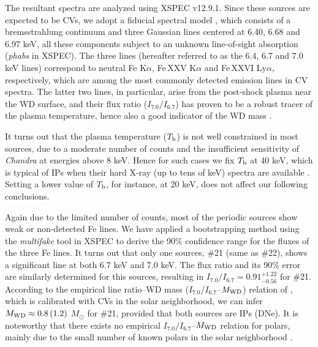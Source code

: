 \documentclass[fleqn,usenatbib]{mnras}
\begin{document}
The resultant spectra are analyzed using XSPEC v12.9.1.
Since these sources are expected to be CVs, we adopt a fiducial spectral model \citep{2018ApJS..235...26Z,2019ApJ...882..164X}, which consists of a bremsstrahlung continuum and three Gaussian lines centered at 6.40, 6.68 and 6.97 keV, all these components subject to an unknown line-of-sight absorption (\emph{phabs} in XSPEC). 
The three lines (hereafter referred to as the 6.4, 6.7 and 7.0 keV lines) correspond to neutral Fe K$\alpha$, Fe\,XXV K$\alpha$ and Fe\,XXVI Ly$\alpha$, respectively, which are among the most commonly detected emission lines in CV spectra. The latter two lines, in particular, arise from the post-shock plasma near the WD surface, and their flux ratio ($I_{7.0}/I_{6.7}$) has proven to be a robust tracer of the plasma temperature, hence also a good indicator of the WD mass \citep{2016ApJ...818..136X}.

It turns out that the plasma temperature ($T_{\rm b}$) is not well constrained in most sources, due to a moderate number of counts and the insufficient sensitivity of {\it Chandra} at energies above 8 keV. Hence for such cases we fix $T_{\rm b}$ at 40 keV, which is typical of IPs when their hard X-ray (up to tens of keV) spectra are available \citep{2016ApJ...818..136X,2016ApJ...826..160H}.
Setting a lower value of $T_{\rm b}$, for instance, at 20 keV, does not affect our following conclusions. 

Again due to the limited number of counts, most of the periodic sources show weak or non-detected Fe lines.  
We have applied a bootstrapping method using the {\it multifake} tool in XSPEC to derive the 90\% confidence range for the fluxes of the three Fe lines. It turns out that only one sources, \#21 (same as \#22), shows a significant line at both 6.7 keV and 7.0 keV.  
The flux ratio and its 90\% error are similarly determined for this sources, resulting in $I_{7.0}/I_{6.7} = 0.91^{+1.22}_{-0.56}$ for \#21.   
According to the empirical line ratio--WD mass  ($I_{7.0}/I_{6.7}$--$M_{\rm WD}$) relation of \citet{2019ApJ...882..164X}, which is calibrated with CVs in the solar neighborhood, we can infer $M_{\rm WD} \approx 0.8 \, (1.2) $  $M_\odot$ for \#21, provided that both sources are IPs (DNe). 
It is noteworthy that there exists no empirical $I_{7.0}/I_{6.7}$--$M_{\rm WD}$ relation for polars, mainly due to the small number of known polars in the solar neighborhood \citep{2019ApJ...882..164X}. 
\end{document}
